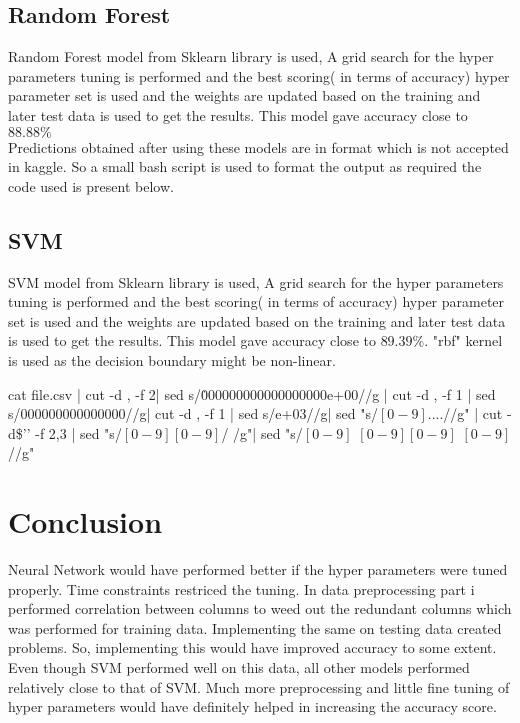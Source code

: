\documentclass{article}
\begin{document}
\subsection{Random Forest}
Random Forest model from Sklearn library is used, A grid search for the hyper parameters tuning is performed and the best scoring( in terms of accuracy) hyper parameter set is used and the weights are updated based on the training and later test data is used to get the results. This model gave accuracy close to $88.88\%$\\

Predictions obtained after using these models are in format which is not accepted in kaggle. So a small bash script is used to format the output as required the code used is present below.


\subsection{SVM}
SVM model from Sklearn library is used, A grid search for the hyper parameters tuning is performed and the best scoring( in terms of accuracy) hyper parameter set is used and the weights are updated based on the training and later test data is used to get the results. This model gave accuracy close to $89.39\%$. "rbf" kernel is used as the decision boundary might be non-linear. 

\begin{spverbatim}
  cat file.csv | cut -d , -f 2| sed s/\.000000000000000000e+00//g | cut -d , -f 1 | sed s/000000000000000//g| cut -d , -f 1 | sed s/e+03//g| sed "s/\([0-9]\).\(...\)/\1\2/g" | cut -d\$'\n' -f 2,3 | sed "s/\([0-9]\)\([0-9]\)/\1 \2/g"| sed "s/\([0-9]\) \([0-9][0-9]\) \([0-9]\)/\1\2\3/g" 
\end{spverbatim}
\section{Conclusion}
Neural Network would have performed better if the hyper parameters were tuned properly. Time constraints restriced the tuning. In data preprocessing part i performed correlation between columns to weed out the redundant columns which was performed for training data. Implementing the same on testing data created problems. So, implementing this would have improved accuracy to some extent. Even though SVM performed well on this data, all other models performed relatively close to that of SVM. Much more preprocessing and little fine tuning of hyper parameters would have definitely helped in increasing the accuracy score.
\end{document}

